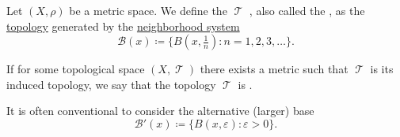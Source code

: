 \begin{definition}\label{def:metric_topology}
  Let \( (X, \rho) \) be a metric space. We define the \( \mscrT \) , also called the , as the \hyperref[def:topological_space]{topology} generated by the \hyperref[def:topological_local_base]{neighborhood system}
  \begin{equation}\label{def:metric_topology/integer_base}
    \mathcal{B}(x) \coloneqq \{ B(x, \tfrac 1 n) \colon n = 1, 2, 3, \ldots \}.
  \end{equation}

  If for some topological space \( (X, \mscrT) \) there exists a metric such that \( \mscrT \) is its induced topology, we say that the topology \( \mscrT \) is .

  It is often conventional to consider the alternative (larger) base
  \begin{equation}\label{def:metric_topology/real_base}
    \mathcal{B}'(x) \coloneqq \{ B(x, \varepsilon) \colon \varepsilon > 0 \}.
  \end{equation}
\end{definition}
